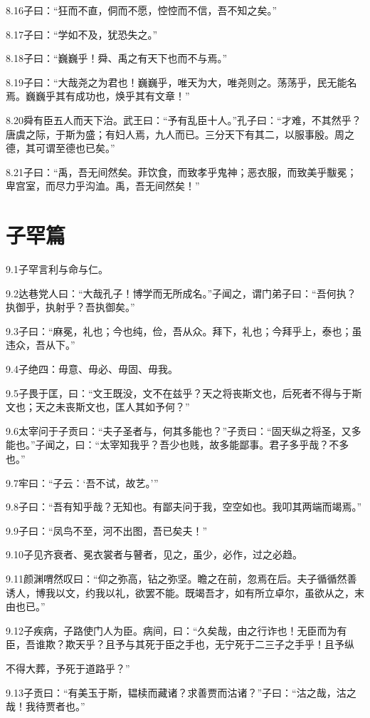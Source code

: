 \documentclass[a4paper,12pt,UTF8,twoside]{ctexbook}
\begin{document}
8.16子曰：“狂而不直，侗而不愿，悾悾而不信，吾不知之矣。”

8.17子曰：“学如不及，犹恐失之。”

8.18子曰：“巍巍乎！舜、禹之有天下也而不与焉。”

8.19子曰：“大哉尧之为君也！巍巍乎，唯天为大，唯尧则之。荡荡乎，民无能名焉。巍巍乎其有成功也，焕乎其有文章！”

8.20舜有臣五人而天下治。武王曰：“予有乱臣十人。”孔子曰：“才难，不其然乎？唐虞之际，于斯为盛；有妇人焉，九人而已。三分天下有其二，以服事殷。周之德，其可谓至德也已矣。”

8.21子曰：“禹，吾无间然矣。菲饮食，而致孝乎鬼神；恶衣服，而致美乎黻冕；卑宫室，而尽力乎沟洫。禹，吾无间然矣！”

\chapter{子罕篇}
9.1子罕言利与命与仁。

9.2达巷党人曰：“大哉孔子！博学而无所成名。”子闻之，谓门弟子曰：“吾何执？执御乎，执射乎？吾执御矣。”

9.3子曰：“麻冕，礼也；今也纯，俭，吾从众。拜下，礼也；今拜乎上，泰也；虽违众，吾从下。”

9.4子绝四：毋意、毋必、毋固、毋我。

9.5子畏于匡，曰：“文王既没，文不在兹乎？天之将丧斯文也，后死者不得与于斯文也；天之未丧斯文也，匡人其如予何？”

9.6太宰问于子贡曰：“夫子圣者与，何其多能也？”子贡曰：“固天纵之将圣，又多能也。”子闻之，曰：“太宰知我乎？吾少也贱，故多能鄙事。君子多乎哉？不多也。”

9.7牢曰：“子云：‘吾不试，故艺。’”

9.8子曰：“吾有知乎哉？无知也。有鄙夫问于我，空空如也。我叩其两端而竭焉。”

9.9子曰：“凤鸟不至，河不出图，吾已矣夫！”

9.10子见齐衰者、冕衣裳者与瞽者，见之，虽少，必作，过之必趋。

9.11颜渊喟然叹曰：“仰之弥高，钻之弥坚。瞻之在前，忽焉在后。夫子循循然善诱人，博我以文，约我以礼，欲罢不能。既竭吾才，如有所立卓尔，虽欲从之，末由也已。”

9.12子疾病，子路使门人为臣。病间，曰：“久矣哉，由之行诈也！无臣而为有臣，吾谁欺？欺天乎？且予与其死于臣之手也，无宁死于二三子之手乎！且予纵

不得大葬，予死于道路乎？”

9.13子贡曰：“有美玉于斯，韫椟而藏诸？求善贾而沽诸？”子曰：“沽之哉，沽之哉！我待贾者也。”
\end{document}
